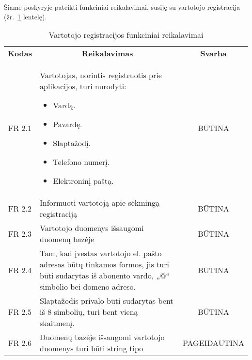 \documentclass{VUMIFPSkursinis}
\begin{document}
Šiame poskyryje pateikti funkciniai reikalavimai, susiję su vartotojo registracija (žr.~\ref{table:VartotojoRegistracija} lentelę).
\begin{center}

	\begin{table}[H]
	\begin{tabular}{|p{2cm}|p{}|p{}|}
	\hline
	    \rowcolor{lightgray}
		\multicolumn{3}{|c|}{Vartotojo registracija}\\
		
	\hline
		\multicolumn{1}{|c|}{{\bfseries Kodas}}&
		\multicolumn{1}{|c|}{{\bfseries Reikalavimas}}&
		\multicolumn{1}{|c|}{{\bfseries Svarba}}\\

	\hline
	\multicolumn{1}{|c|}{FR 2.1}&
	{Vartotojas, norintis registruotis prie aplikacijos, turi nurodyti:
		\begin{itemize}
			\item Vardą.
			\item Pavardę.
			\item Slaptažodį.
			\item Telefono numerį.
			\item Elektroninį paštą.
		\end{itemize}}&		
	\multicolumn{1}{|c|}{BŪTINA}\\
	\hline
	
		\multicolumn{1}{|c|}{FR 2.2}&
		{Informuoti vartotoją apie sėkmingą registraciją}&
		\multicolumn{1}{|c|}{BŪTINA}\\	
	\hline
		\multicolumn{1}{|c|}{FR 2.3}&
		{Vartotojo duomenys išsaugomi duomenų bazėje}&
		\multicolumn{1}{|c|}{BŪTINA}\\	
	\hline	
		\multicolumn{1}{|c|}{FR 2.4}&
		{Tam, kad įvestas vartotojo el. pašto adresas būtų tinkamos formos, jis turi būti sudarytas iš abonento vardo, „@“ simbolio bei domeno adreso.}&
		\multicolumn{1}{|c|}{BŪTINA}\\	
	\hline
		\multicolumn{1}{|c|}{FR 2.5}&
		{Slaptažodis privalo būti sudarytas bent iš 8 simbolių, turi bent vieną skaitmenį.
}&
		\multicolumn{1}{|c|}{BŪTINA}\\		
	\hline
		\multicolumn{1}{|c|}{FR 2.6}&
		{Duomenų bazėje išsaugomi vartotojo duomenys turi būti string tipo }&
		\multicolumn{1}{|p{1.5cm}|}{PAGEIDAUTINA}\\		
	\hline
	
	\end{tabular}
	\caption{Vartotojo registracijos funkciniai reikalavimai}
	\label{table:VartotojoRegistracija}
	\end{table}


\end{center}
\end{document}
